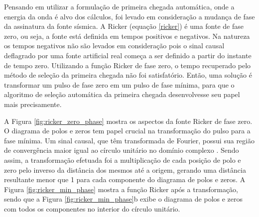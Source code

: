Pensando em utilizar a formulação de primeira chegada automática, onde a energia da onda é alvo dos cálculos, foi levado em consideração a mudança de fase da assinatura da fonte sísmica. A Ricker (equação \ref{ricker}) é uma fonte de fase zero, ou seja, a fonte está definida em tempos positivos e negativos. Na natureza os tempos negativos não são levados em consideração pois o sinal causal deflagrado por uma fonte artificial real começa a ser definido a partir do instante de tempo zero. Utilizando a função Ricker de fase zero, o tempo recuperado pelo método de seleção da primeira chegada não foi satisfatório. Então, uma solução é transformar um pulso de fase zero em um pulso de fase mínima, para que o algoritmo de seleção automática da primeira chegada desenvolvesse seu papel mais precisamente.

A Figura \ref{fig:ricker_zero_phase} mostra os aspectos da fonte Ricker de fase zero. O diagrama de polos e zeros tem papel crucial na transformação do pulso para a fase mínima. Um sinal causal, que têm transformada de Fourier, possui sua região de convergência maior igual ao círculo unitário no domínio complexo \cite{proakis1975digital, oppenheim1987digital, oppenheim1997signals}. Sendo assim, a transformação efetuada foi a multiplicação de cada posição de polo e zero pelo inverso da distância dos mesmos até a origem, gerando uma distância resultante menor que 1 para cada componente do diagrama de polos e zeros. A Figura \ref{fig:ricker_min_phase} mostra a função Ricker após a transformação, sendo que a Figura \ref{fig:ricker_min_phase}b exibe o diagrama de polos e zeros com todos os componentes no interior do círculo unitário.    

